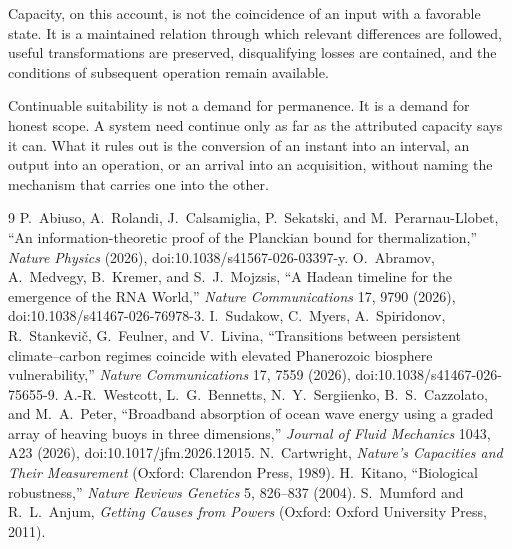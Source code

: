 \documentclass[11pt]{article}
\theoremstyle{definition}
\begin{document}
Capacity, on this account, is not the coincidence of an input with a favorable state. It is a maintained relation through which relevant differences are followed, useful transformations are preserved, disqualifying losses are contained, and the conditions of subsequent operation remain available.

Continuable suitability is not a demand for permanence. It is a demand for honest scope. A system need continue only as far as the attributed capacity says it can. What it rules out is the conversion of an instant into an interval, an output into an operation, or an arrival into an acquisition, without naming the mechanism that carries one into the other.

\begin{thebibliography}{9}
\small
{} P.~Abiuso, A.~Rolandi, J.~Calsamiglia, P.~Sekatski, and M.~Perarnau-Llobet, ``An information-theoretic proof of the Planckian bound for thermalization,'' \emph{Nature Physics} (2026), doi:10.1038/s41567-026-03397-y.
 O.~Abramov, A.~Medvegy, B.~Kremer, and S.~J.~Mojzsis, ``A Hadean timeline for the emergence of the RNA World,'' \emph{Nature Communications} 17, 9790 (2026), doi:10.1038/s41467-026-76978-3.
 I.~Sudakow, C.~Myers, A.~Spiridonov, R.~Stankevi\v{c}, G.~Feulner, and V.~Livina, ``Transitions between persistent climate--carbon regimes coincide with elevated Phanerozoic biosphere vulnerability,'' \emph{Nature Communications} 17, 7559 (2026), doi:10.1038/s41467-026-75655-9.
 A.-R.~Westcott, L.~G.~Bennetts, N.~Y.~Sergiienko, B.~S.~Cazzolato, and M.~A.~Peter, ``Broadband absorption of ocean wave energy using a graded array of heaving buoys in three dimensions,'' \emph{Journal of Fluid Mechanics} 1043, A23 (2026), doi:10.1017/jfm.2026.12015.
 N.~Cartwright, \emph{Nature's Capacities and Their Measurement} (Oxford: Clarendon Press, 1989).
 H.~Kitano, ``Biological robustness,'' \emph{Nature Reviews Genetics} 5, 826--837 (2004).
 S.~Mumford and R.~L.~Anjum, \emph{Getting Causes from Powers} (Oxford: Oxford University Press, 2011).
\end{thebibliography}
\end{document}
